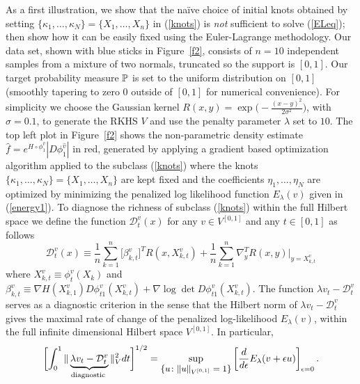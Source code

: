 \documentclass[noinfoline]{imsart}
\begin{document}
As a first illustration, we show that the na\"ive choice of initial knots obtained by setting $\{\kappa_1,\ldots, \kappa_N\}=\{ X_1,\ldots,X_n\}$ in (\ref{knots})  is {\em not} sufficient to solve  (\ref{ELeq}); then show how it can be easily fixed using the Euler-Lagrange methodology. 
 Our data set, shown with blue sticks in Figure~\ref{f2}, consists of $n=10$ independent samples from a mixture of two normals, truncated so the support is $[0,1]$.  Our target probability measure $\Bbb P$ is set to the uniform distribution on  $[0,1]$ (smoothly tapering to zero $0$ outside of $[0,1]$ for numerical convenience).
  For simplicity we choose the Gaussian kernel $R(x,y)=\exp\bigl(-\frac{(x-y)^2}{2\sigma^2}\bigr)$, with $\sigma=0.1$, to generate the RKHS $V$ and use the  penalty parameter $\lambda$ set to $10$. The top left plot in Figure~\ref{f2} shows the non-parametric density estimate $\hat f= e^{ H\circ \phi^{\hat v}_1}  |D\phi_1^{\hat v}| $ in red, generated by applying a gradient based optimization algorithm applied to the subclass (\ref{knots}) where the knots $\{\kappa_1,\ldots, \kappa_N\}=\{X_1,\ldots, X_n\}$ are kept fixed and the coefficients $\eta_1,\ldots, \eta_N$ are optimized by minimizing the penalized log likelihood function $E_\lambda (v)$ given in (\ref{energy1}).  
 To diagnose the richness of subclass (\ref{knots}) within the full Hilbert space we define the function $\mathcal D_t^v(x)$ for any $v\in V^{[0,1]}$ and any $t\in [0,1]$ as follows
 \begin{equation}
 \label{diag1}
 \mathcal D_t^v(x) \equiv    \frac{1}{ n}\sum_{k=1}^n \bigl[\beta_{k,t}^v\bigr]^T R(x, X_{k,t}^v )  +  \frac{1}{ n}\sum_{k=1}^n   \nabla_{y}^T R(x,y)\Bigr|_{y= X_{k,t}^v}
 \end{equation}
where $X_{k,t}^v\equiv \phi_t^{v} (X_k)$ and 
$ \beta_{k,t}^v\equiv   \nabla H(X^v_{k,1}) D\phi^{v}_{t1}(X_{k,t}^v)  +\nabla \log\det D\phi^{ v}_{t1} (X^v_{k,t})$. 
The function $\lambda v_t - \mathcal D_t^v$ serves as a diagnostic criterion in the sense that
  the Hilbert norm of $\lambda v_t - \mathcal D_t^v$ gives  the maximal rate of change of the penalized log-likelihood $E_\lambda(v)$, within the full infinite dimensional Hilbert space $V^{[0,1]}$. In particular, 
 \[   \biggl[\int_0^1\|\underbrace{ \lambda v_t-\mathcal D_t^v}_\text{\scriptsize diagnostic } \|_{V}^2dt\biggr]^{1/2} = \sup_\text{\small $\{ u\colon \| u \|_{V^{[0,1]}}= 1 \}$} \left[\frac{d}{d\epsilon} E_\lambda (v+\epsilon u)\right]_{\epsilon = 0} .   \]
\end{document}

